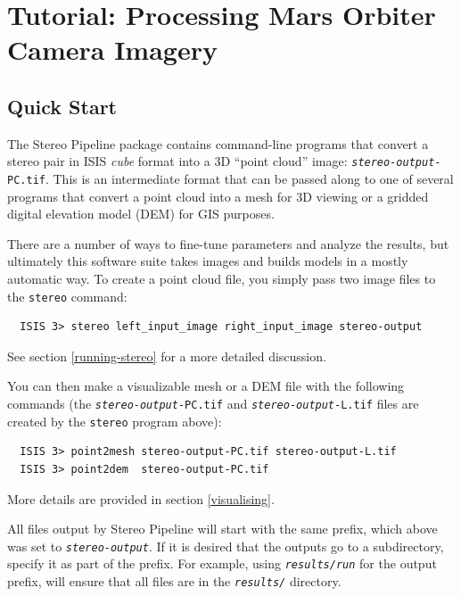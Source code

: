\chapter{Tutorial: Processing Mars Orbiter Camera Imagery}
\label{ch:tutorial}


\section{Quick Start}

The Stereo Pipeline package contains command-line programs that
convert a stereo pair in ISIS {\em cube} format into a 3D ``point
cloud'' image: \texttt{\textit{stereo-output}-PC.tif}.  This is an
intermediate format that can be passed along to one of several
programs that convert a point cloud into a mesh for 3D viewing or a
gridded digital elevation model (DEM) for GIS purposes.

There are a number of ways to fine-tune parameters and analyze the
results, but ultimately this software suite takes images and builds
models in a mostly automatic way.  To create a point cloud file, you
simply pass two image files to the \texttt{stereo} command:

\begin{verbatim}
  ISIS 3> stereo left_input_image right_input_image stereo-output
\end{verbatim}

See section \ref{running-stereo} for a more detailed discussion. 
 
You can then make a visualizable mesh or a \ac{DEM} file with the following
commands (the \texttt{\textit{stereo-output}-PC.tif} and
\texttt{\textit{stereo-output}-L.tif} files are created by the
\texttt{stereo} program above):
 
\begin{verbatim}
  ISIS 3> point2mesh stereo-output-PC.tif stereo-output-L.tif
  ISIS 3> point2dem  stereo-output-PC.tif
\end{verbatim}

More details are provided in section \ref{visualising}.

All files output by Stereo Pipeline will start with the same prefix,
which above was set to \texttt{\textit{stereo-output}}. If it is desired
that the outputs go to a subdirectory, specify it as part of the
prefix. For example, using \texttt{\textit{results/run}} for the output
prefix, will ensure that all files are in the \texttt{\textit{results/}} directory.

